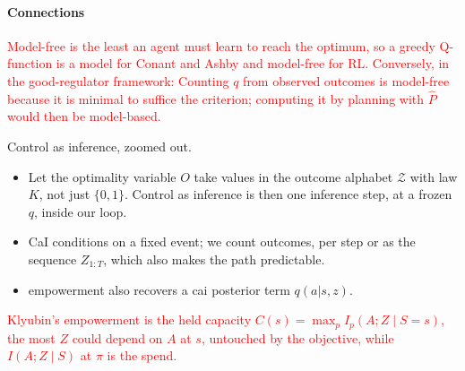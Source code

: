 \documentclass[10pt]{article}
\newcommand{\add}[1]{\textcolor{red}{#1}}
\begin{document}
\paragraph{Connections}
\add{Model-free is the least an agent must learn to reach the optimum, so a greedy Q-function is a model for Conant and Ashby and model-free for RL.} \add{Conversely, in the good-regulator framework: Counting $q$ from observed outcomes is model-free because it is minimal to suffice the criterion; computing it by planning with $\hat P$ would then be model-based.}

Control as inference, zoomed out.
\begin{itemize}
  \item Let the optimality variable $O$ take values in the outcome alphabet $\mathcal Z$ with law $K$, not just $\{0,1\}$. Control as inference is then one inference step, at a frozen $q$, inside our loop.
  \item CaI conditions on a fixed event; we count outcomes, per step or as the sequence $Z_{1:T}$, which also makes the path predictable.
  \item empowerment also recovers a cai posterior term $q(a|s,z)$.
\end{itemize}
\add{Klyubin's empowerment is the held capacity $C(s) = \max_p I_p(A;Z \mid S{=}s)$, the most $Z$ could depend on $A$ at $s$, untouched by the objective, while $I(A;Z \mid S)$ at $\pi$ is the spend.}
\end{document}
